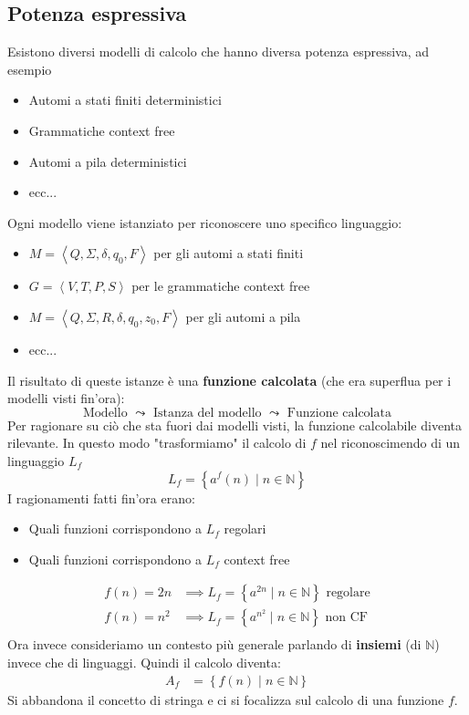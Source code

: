 \documentclass[a4paper]{article}
\begin{document}
\subsection{Potenza espressiva}
Esistono diversi modelli di calcolo che hanno diversa potenza espressiva, ad esempio
\begin{itemize}
  \item Automi a stati finiti deterministici
  \item Grammatiche context free
  \item Automi a pila deterministici
  \item ecc...
\end{itemize}
Ogni modello viene istanziato per riconoscere uno specifico linguaggio:
\begin{itemize}
  \item \( M = \left< Q, \Sigma, \delta, q_0, F \right> \) per gli automi a stati finiti
  \item \( G = \left< V, T, P, S \right> \) per le grammatiche context free
  \item \( M = \left< Q, \Sigma, R, \delta, q_0, z_0, F \right> \) per gli automi a pila
  \item ecc...
\end{itemize}
Il risultato di queste istanze è una \textbf{funzione calcolata} (che era superflua
per i modelli visti fin'ora):
\[
  \text{Modello } \leadsto \text{ Istanza del modello } \leadsto \text{ Funzione calcolata}
\] 
Per ragionare su ciò che sta fuori dai modelli visti, la funzione calcolabile diventa
rilevante. In questo modo "trasformiamo" il calcolo di \( f \) nel riconoscimendo di
un linguaggio \( L_f \) 
\[
  L_f = \left\{ a^f(n) \;\left|\; n \in \mathbb{N} \right. \right\}
\] 
I ragionamenti fatti fin'ora erano:
\begin{itemize}
  \item Quali funzioni corrispondono a \( L_f \) regolari
  \item Quali funzioni corrispondono a \( L_f \) context free
\end{itemize}
\[
 \begin{aligned}
 f(n) = 2n &\implies L_f = \left\{ a^{2n} \;\left|\; n \in \mathbb{N} \right. \right\} \text{ regolare}\\
  f(n) = n^2 &\implies L_f = \left\{ a^{n^2} \;\left|\; n \in \mathbb{N} \right. \right\} \text{ non CF}\\
 \end{aligned}
\] 
Ora invece consideriamo un contesto più generale parlando di \textbf{insiemi} (di \( \mathbb{N} \))
invece che di linguaggi. Quindi il calcolo diventa:
\[
  \begin{aligned}
    A_f &= \left\{ f(n) \;\left|\; n \in \mathbb{N} \right. \right\}
  \end{aligned}
\] 
Si abbandona il concetto di stringa e ci si focalizza sul calcolo di una funzione \( f \).
\end{document}
